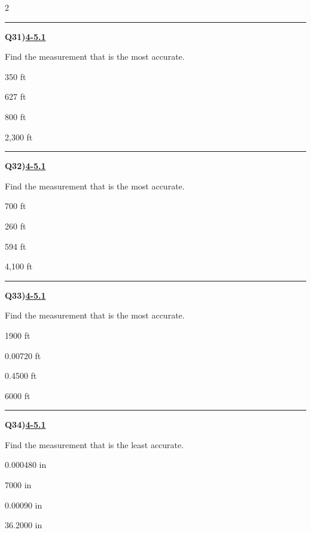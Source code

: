 \documentclass[11pt]{article}
\newenvironment{Qbox}[2]{%
  \par\medskip\noindent\begin{minipage}{\linewidth}%
  \hrule\medskip%
  \textbf{Q#1)}\hfill\textbf{\underline{#2}}\par\smallskip%
}{\par\end{minipage}\par\medskip}
\begin{document}
\begin{multicols}{2}
\begin{Qbox}{31}{4-5.1}
Find the measurement that is the most accurate.
\begin{choices}
  \item 350 ft
  \item 627 ft
  \item 800 ft
  \item 2,300 ft
\end{choices}
\end{Qbox}

\begin{Qbox}{32}{4-5.1}
Find the measurement that is the most accurate.
\begin{choices}
  \item 700 ft
  \item 260 ft
  \item 594 ft
  \item 4,100 ft
\end{choices}
\end{Qbox}

\begin{Qbox}{33}{4-5.1}
Find the measurement that is the most accurate.
\begin{choices}
  \item 1900 ft
  \item 0.00720 ft
  \item 0.4500 ft
  \item 6000 ft
\end{choices}
\end{Qbox}

\begin{Qbox}{34}{4-5.1}
Find the measurement that is the least accurate.
\begin{choices}
  \item 0.000480 in
  \item 7000 in
  \item 0.00090 in
  \item 36.2000 in
\end{choices}
\end{Qbox}


\end{multicols}
\end{document}
